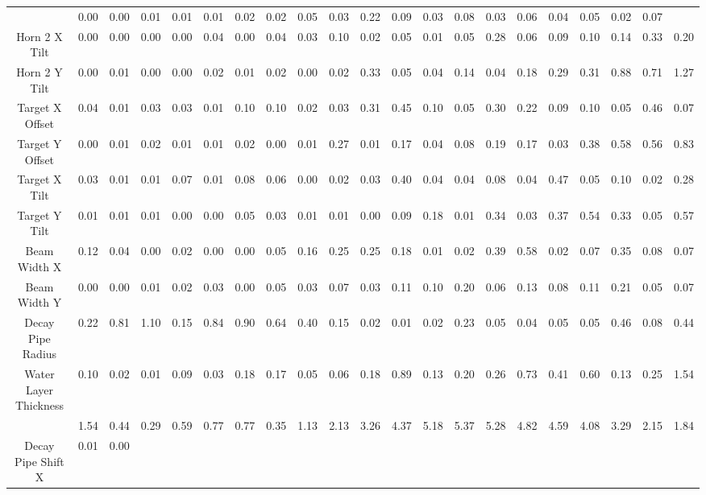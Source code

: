 \begin{table}[ht]
\begin{tabular}{|c | c c c c c c c c c c c c c c c c c c c c | }
 & 0.00
 & 0.00
 & 0.01
 & 0.01
 & 0.01
 & 0.02
 & 0.02
 & 0.05
 & 0.03
 & 0.22
 & 0.09
 & 0.03
 & 0.08
 & 0.03
 & 0.06
 & 0.04
 & 0.05
 & 0.02
 & 0.07
\\
Horn 2 X Tilt & 0.00
 & 0.00
 & 0.00
 & 0.00
 & 0.04
 & 0.00
 & 0.04
 & 0.03
 & 0.10
 & 0.02
 & 0.05
 & 0.01
 & 0.05
 & 0.28
 & 0.06
 & 0.09
 & 0.10
 & 0.14
 & 0.33
 & 0.20
\\
Horn 2 Y Tilt & 0.00
 & 0.01
 & 0.00
 & 0.00
 & 0.02
 & 0.01
 & 0.02
 & 0.00
 & 0.02
 & 0.33
 & 0.05
 & 0.04
 & 0.14
 & 0.04
 & 0.18
 & 0.29
 & 0.31
 & 0.88
 & 0.71
 & 1.27
\\
Target X Offset & 0.04
 & 0.01
 & 0.03
 & 0.03
 & 0.01
 & 0.10
 & 0.10
 & 0.02
 & 0.03
 & 0.31
 & 0.45
 & 0.10
 & 0.05
 & 0.30
 & 0.22
 & 0.09
 & 0.10
 & 0.05
 & 0.46
 & 0.07
\\
Target Y Offset & 0.00
 & 0.01
 & 0.02
 & 0.01
 & 0.01
 & 0.02
 & 0.00
 & 0.01
 & 0.27
 & 0.01
 & 0.17
 & 0.04
 & 0.08
 & 0.19
 & 0.17
 & 0.03
 & 0.38
 & 0.58
 & 0.56
 & 0.83
\\
Target X Tilt & 0.03
 & 0.01
 & 0.01
 & 0.07
 & 0.01
 & 0.08
 & 0.06
 & 0.00
 & 0.02
 & 0.03
 & 0.40
 & 0.04
 & 0.04
 & 0.08
 & 0.04
 & 0.47
 & 0.05
 & 0.10
 & 0.02
 & 0.28
\\
Target Y Tilt & 0.01
 & 0.01
 & 0.01
 & 0.00
 & 0.00
 & 0.05
 & 0.03
 & 0.01
 & 0.01
 & 0.00
 & 0.09
 & 0.18
 & 0.01
 & 0.34
 & 0.03
 & 0.37
 & 0.54
 & 0.33
 & 0.05
 & 0.57
\\
Beam Width X & 0.12
 & 0.04
 & 0.00
 & 0.02
 & 0.00
 & 0.00
 & 0.05
 & 0.16
 & 0.25
 & 0.25
 & 0.18
 & 0.01
 & 0.02
 & 0.39
 & 0.58
 & 0.02
 & 0.07
 & 0.35
 & 0.08
 & 0.07
\\
Beam Width Y & 0.00
 & 0.00
 & 0.01
 & 0.02
 & 0.03
 & 0.00
 & 0.05
 & 0.03
 & 0.07
 & 0.03
 & 0.11
 & 0.10
 & 0.20
 & 0.06
 & 0.13
 & 0.08
 & 0.11
 & 0.21
 & 0.05
 & 0.07
\\
Decay Pipe Radius & 0.22
 & 0.81
 & 1.10
 & 0.15
 & 0.84
 & 0.90
 & 0.64
 & 0.40
 & 0.15
 & 0.02
 & 0.01
 & 0.02
 & 0.23
 & 0.05
 & 0.04
 & 0.05
 & 0.05
 & 0.46
 & 0.08
 & 0.44
\\
Water Layer Thickness & 0.10
 & 0.02
 & 0.01
 & 0.09
 & 0.03
 & 0.18
 & 0.17
 & 0.05
 & 0.06
 & 0.18
 & 0.89
 & 0.13
 & 0.20
 & 0.26
 & 0.73
 & 0.41
 & 0.60
 & 0.13
 & 0.25
 & 1.54
\\
 & 1.54
 & 0.44
 & 0.29
 & 0.59
 & 0.77
 & 0.77
 & 0.35
 & 1.13
 & 2.13
 & 3.26
 & 4.37
 & 5.18
 & 5.37
 & 5.28
 & 4.82
 & 4.59
 & 4.08
 & 3.29
 & 2.15
 & 1.84
\\
Decay Pipe Shift X & 0.01
 & 0.00

\end{tabular}
\end{table}

